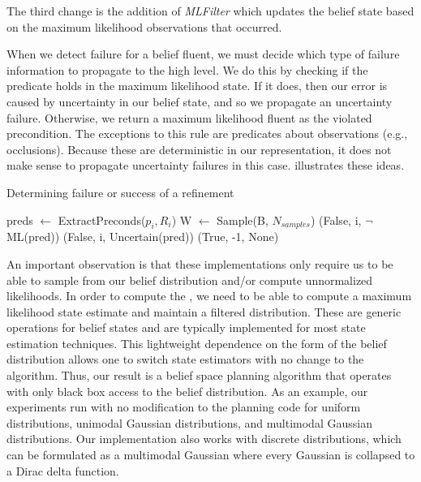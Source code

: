 The third change is the addition of \emph{MLFilter} which updates the belief state based on the maximum likelihood observations that occurred.

When we detect failure for a belief fluent, we must decide which type
of failure information to propagate to the high level. We do this by
checking if the predicate holds in the maximum likelihood state. If it
does, then our error is caused by uncertainty in our belief state, and so
we propagate an uncertainty failure. Otherwise, we return a maximum
likelihood fluent as the violated precondition. The exceptions to this
rule are predicates about observations (e.g., occlusions). Because
these are deterministic in our representation, it does not make sense
to propagate uncertainty failures in this case. 
illustrates these ideas.


\begin{algorithm}
 \caption{Determining failure or success of a refinement} \label{alg-bcheck}
 \begin{algorithmic}[1]
          \State preds $\leftarrow $ ExtractPreconds($p_i, R_i$)
          \State W $\leftarrow$ Sample(B, $N_{samples}$)
                     \State \Return (False, i, $\lnot$ML(pred))
                 \Else
                     \State \Return (False, i, Uncertain(pred))
                 \EndIf
              \EndIf
          \EndFor
      \EndFor
      \State \Return (True, -1, None)
  \EndProcedure
 \end{algorithmic}
\end{algorithm}
An important observation is that these implementations only require
us to be able to sample from our belief distribution and/or compute
unnormalized likelihoods. In order to compute the \mld{}, we need to be
able to compute a maximum likelihood state estimate and maintain a
filtered distribution. These are generic operations for belief states
and are typically implemented for most state estimation
techniques. This lightweight dependence on the form of the belief
distribution allows one to switch state estimators with no
change to the algorithm. Thus, our result is a belief space planning
algorithm that operates with only black box access to the belief
distribution. As an example, our experiments run with no modification
to the planning code for uniform distributions, unimodal Gaussian
distributions, and multimodal Gaussian distributions. Our implementation also works with discrete distributions, which can be formulated as a multimodal Gaussian where every Gaussian is collapsed to a Dirac delta function.

